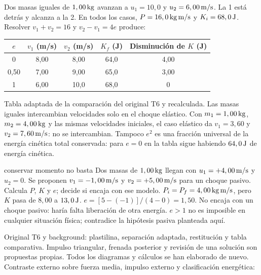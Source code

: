 \documentclass[11pt,a4paper]{article}
\begin{document}
Dos masas iguales de $1,00\,\mathrm{kg}$ avanzan a $u_1=10,0$ y $u_2=6,00\,\mathrm{m/s}$.
La 1 est\'a detr\'as y alcanza a la 2. En todos los casos,
$P=16,0\,\mathrm{kg\,m/s}$ y $K_i=68,0\,\mathrm{J}$.
Resolver $v_1+v_2=16$ y $v_2-v_1=4e$ produce:
\begin{center}
\begin{tabular}{@{}ccccc@{}}
\toprule
$e$ & $v_1$ (m/s) & $v_2$ (m/s) & $K_f$ (J) & Disminuci\'on de $K$ (J)\\
\midrule
0 & 8,00 & 8,00 & 64,0 & 4,00\\
0,50 & 7,00 & 9,00 & 65,0 & 3,00\\
1 & 6,00 & 10,0 & 68,0 & 0\\
\bottomrule
\end{tabular}
\end{center}
Tabla adaptada de la comparaci\'on del original T6 y recalculada.
Las masas iguales intercambian velocidades solo en el choque el\'astico.
Con $m_1=1,00\,\mathrm{kg}$, $m_2=4,00\,\mathrm{kg}$ y las mismas velocidades iniciales,
el caso el\'astico da $v_1=3,60$ y $v_2=7,60\,\mathrm{m/s}$: no se intercambian.
Tampoco $e^2$ es una fracci\'on universal de la energ\'ia cin\'etica total conservada:
para $e=0$ en la tabla sigue habiendo $64,0\,\mathrm{J}$ de energ\'ia cin\'etica.

\begin{exercisebox}{conservar momento no basta}
Dos masas de $1,00\,\mathrm{kg}$ llegan con $u_1=+4,00\,\mathrm{m/s}$ y $u_2=0$.
Se proponen $v_1=-1,00\,\mathrm{m/s}$ y $v_2=+5,00\,\mathrm{m/s}$ para un choque pasivo.
Calcula $P$, $K$ y $e$; decide si encaja con ese modelo.
\solutionblock
$P_i=P_f=4,00\,\mathrm{kg\,m/s}$, pero $K$ pasa de $8,00$ a $13,0\,\mathrm{J}$.
$e=[5-(-1)]/(4-0)=1,50$.
No encaja con un choque pasivo: har\'ia falta liberaci\'on de otra energ\'ia.
$e>1$ no es imposible en cualquier situaci\'on f\'isica; contradice la hip\'otesis
pasiva planteada aqu\'i.
\end{exercisebox}

Original T6 y background: plastilina, separaci\'on adaptada, restituci\'on y tabla
comparativa. Impulso triangular, frenada posterior y revisi\'on de una soluci\'on
son propuestas propias. Todos los diagramas y c\'alculos se han elaborado de nuevo.
Contraste externo sobre fuerza media, impulso externo y clasificaci\'on energ\'etica:
\end{document}
